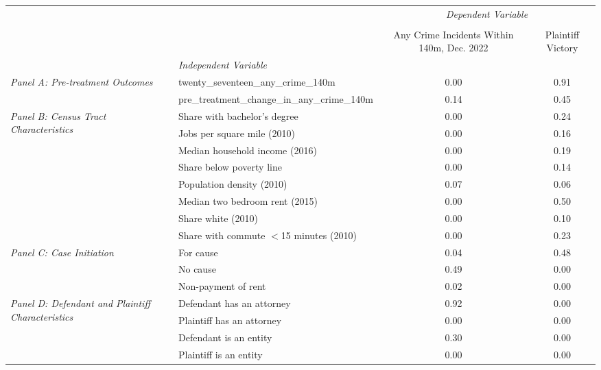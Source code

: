 \begin{tabular}{llcc}
\toprule
 &  & \multicolumn{2}{c}{\textit{Dependent Variable}} \\
\cline{3-4}
\\
 &  & Any Crime Incidents Within 140m, Dec. 2022 & Plaintiff Victory \\
 & \emph{Independent Variable} &  &  \\
\midrule
\multirow[c]{2}{3cm}{\textit{Panel A: Pre-treatment Outcomes}} & twenty_seventeen_any_crime_140m & 0.00 & 0.91 \\
 & pre_treatment_change_in_any_crime_140m & 0.14 & 0.45 \\
\cline{1-4}
\multirow[c]{8}{3cm}{\textit{Panel B: Census Tract Characteristics}} & Share with bachelor's degree & 0.00 & 0.24 \\
 & Jobs per square mile (2010) & 0.00 & 0.16 \\
 & Median household income (2016) & 0.00 & 0.19 \\
 & Share below poverty line & 0.00 & 0.14 \\
 & Population density (2010) & 0.07 & 0.06 \\
 & Median two bedroom rent (2015) & 0.00 & 0.50 \\
 & Share white (2010) & 0.00 & 0.10 \\
 & Share with commute $<$15 minutes (2010) & 0.00 & 0.23 \\
\cline{1-4}
\multirow[c]{3}{3cm}{\textit{Panel C: Case Initiation}} & For cause & 0.04 & 0.48 \\
 & No cause & 0.49 & 0.00 \\
 & Non-payment of rent & 0.02 & 0.00 \\
\cline{1-4}
\multirow[c]{4}{3cm}{\textit{Panel D: Defendant and Plaintiff Characteristics}} & Defendant has an attorney & 0.92 & 0.00 \\
 & Plaintiff has an attorney & 0.00 & 0.00 \\
 & Defendant is an entity & 0.30 & 0.00 \\
 & Plaintiff is an entity & 0.00 & 0.00 \\
\cline{1-4}
\bottomrule
\end{tabular}
